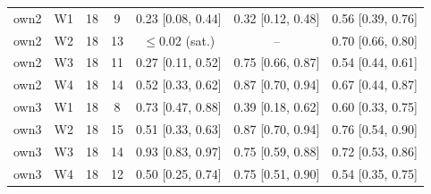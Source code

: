 \begin{tabular}{llccccc}
own2 & W1 & 18 & 9 & 0.23 [0.08, 0.44] & 0.32 [0.12, 0.48] & 0.56 [0.39, 0.76] \\
own2 & W2 & 18 & 13 & $\leq$0.02 (sat.) & -- & 0.70 [0.66, 0.80] \\
own2 & W3 & 18 & 11 & 0.27 [0.11, 0.52] & 0.75 [0.66, 0.87] & 0.54 [0.44, 0.61] \\
own2 & W4 & 18 & 14 & 0.52 [0.33, 0.62] & 0.87 [0.70, 0.94] & 0.67 [0.44, 0.87] \\
own3 & W1 & 18 & 8 & 0.73 [0.47, 0.88] & 0.39 [0.18, 0.62] & 0.60 [0.33, 0.75] \\
own3 & W2 & 18 & 15 & 0.51 [0.33, 0.63] & 0.87 [0.70, 0.94] & 0.76 [0.54, 0.90] \\
own3 & W3 & 18 & 14 & 0.93 [0.83, 0.97] & 0.75 [0.59, 0.88] & 0.72 [0.53, 0.86] \\
own3 & W4 & 18 & 12 & 0.50 [0.25, 0.74] & 0.75 [0.51, 0.90] & 0.54 [0.35, 0.75] \\
\bottomrule
\end{tabular}
